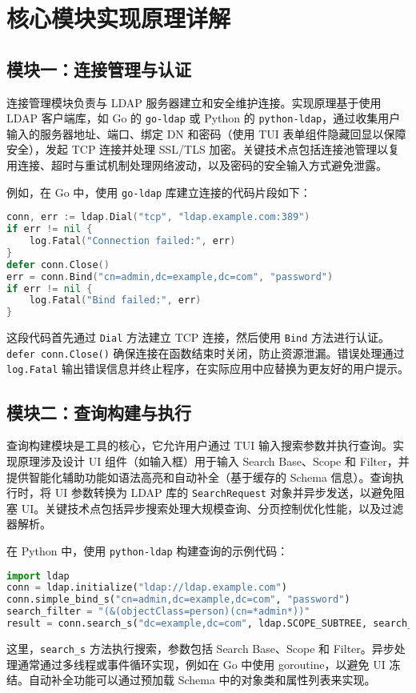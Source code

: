 \chapter{核心模块实现原理详解}
\section{模块一：连接管理与认证}
连接管理模块负责与 LDAP 服务器建立和安全维护连接。实现原理基于使用 LDAP 客户端库，如 Go 的 \texttt{go-ldap} 或 Python 的 \texttt{python-ldap}，通过收集用户输入的服务器地址、端口、绑定 DN 和密码（使用 TUI 表单组件隐藏回显以保障安全），发起 TCP 连接并处理 SSL/TLS 加密。关键技术点包括连接池管理以复用连接、超时与重试机制处理网络波动，以及密码的安全输入方式避免泄露。\par
例如，在 Go 中，使用 \texttt{go-ldap} 库建立连接的代码片段如下：\par
\begin{lstlisting}[language=go]
conn, err := ldap.Dial("tcp", "ldap.example.com:389")
if err != nil {
    log.Fatal("Connection failed:", err)
}
defer conn.Close()
err = conn.Bind("cn=admin,dc=example,dc=com", "password")
if err != nil {
    log.Fatal("Bind failed:", err)
}
\end{lstlisting}
这段代码首先通过 \texttt{Dial} 方法建立 TCP 连接，然后使用 \texttt{Bind} 方法进行认证。\texttt{defer conn.Close()} 确保连接在函数结束时关闭，防止资源泄漏。错误处理通过 \texttt{log.Fatal} 输出错误信息并终止程序，在实际应用中应替换为更友好的用户提示。\par
\section{模块二：查询构建与执行}
查询构建模块是工具的核心，它允许用户通过 TUI 输入搜索参数并执行查询。实现原理涉及设计 UI 组件（如输入框）用于输入 Search Base、Scope 和 Filter，并提供智能化辅助功能如语法高亮和自动补全（基于缓存的 Schema 信息）。查询执行时，将 UI 参数转换为 LDAP 库的 \texttt{SearchRequest} 对象并异步发送，以避免阻塞 UI。关键技术点包括异步搜索处理大规模查询、分页控制优化性能，以及过滤器解析。\par
在 Python 中，使用 \texttt{python-ldap} 构建查询的示例代码：\par
\begin{lstlisting}[language=python]
import ldap
conn = ldap.initialize("ldap://ldap.example.com")
conn.simple_bind_s("cn=admin,dc=example,dc=com", "password")
search_filter = "(&(objectClass=person)(cn=*admin*))"
result = conn.search_s("dc=example,dc=com", ldap.SCOPE_SUBTREE, search_filter)
\end{lstlisting}
这里，\texttt{search\_{}s} 方法执行搜索，参数包括 Search Base、Scope 和 Filter。异步处理通常通过多线程或事件循环实现，例如在 Go 中使用 goroutine，以避免 UI 冻结。自动补全功能可以通过预加载 Schema 中的对象类和属性列表来实现。\par
